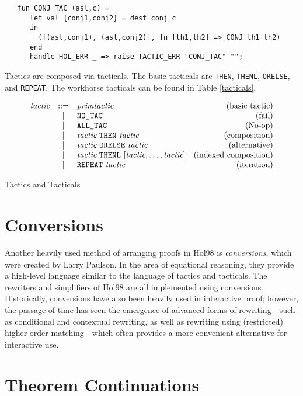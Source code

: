 \documentclass[12pt,fleqn,a4paper]{report}
\newcommand{\tactic}      {\mbox{\it tactic}}
\newcommand{\primtactic}      {\mbox{\it primtactic}}
\begin{document}
\begin{verbatim}
   fun CONJ_TAC (asl,c) =
      let val {conj1,conj2} = dest_conj c
      in
        ([(asl,conj1), (asl,conj2)], fn [th1,th2] => CONJ th1 th2)
      end
      handle HOL_ERR _ => raise TACTIC_ERR "CONJ_TAC" "";
\end{verbatim}

Tactics are composed via tacticals. The basic tacticals are \verb+THEN+,
\verb+THENL+, \verb+ORELSE+, and \verb+REPEAT+. The workhorse tacticals
can be found in Table \ref{tacticals}.

\begin{table}
\[
\begin{array}{rclr}
 \tactic & ::= & \primtactic & \mbox{(basic tactic)} \\
 & | & \verb+NO_TAC+ & \mbox{(fail)} \\
 & | & \verb+ALL_TAC+ & \mbox{(No-op)} \\
 & | & \tactic\ \verb+THEN+ \ \tactic & \mbox{(composition)} \\
 & | & \tactic\ \verb+ORELSE+ \ \tactic & \mbox{(alternative)} \\
 & | & \tactic\ \verb+THENL+ \ [\tactic, \ldots, \tactic] &
\mbox{(indexed composition)} \\
 & | & \verb+REPEAT+\ \tactic & \mbox{(iteration)} \\
\end{array}
\]
\caption{Tactics and Tacticals} \label{tacticals}
\end{table}


\section{Conversions}

Another heavily used method of arranging proofs in Hol98 is {\it
conversions\/}, which were created by Larry Paulson. In the area of
equational reasoning, they provide a high-level language similar to the
language of tactics and tacticals. The rewriters and simplifiers of
Hol98 are all implemented using conversions. Historically, conversions
have also been heavily used in interactive proof; however, the passage
of time has seen the emergence of advanced forms of rewriting---such as
conditional and contextual rewriting, as well as rewriting using
(restricted) higher order matching---which often provides a more
convenient alternative for interactive use.

\section{Theorem Continuations}
\end{document}
